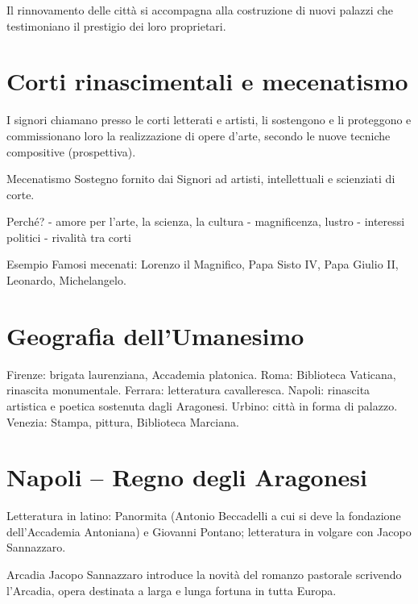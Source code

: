 \documentclass[12pt]{article}
\begin{document}
Il rinnovamento delle città si accompagna alla costruzione di nuovi palazzi che testimoniano il prestigio dei loro proprietari.


\section{Corti rinascimentali e mecenatismo}


I signori chiamano presso le corti letterati e artisti, li sostengono e li proteggono e commissionano loro la realizzazione di opere d'arte, secondo le nuove tecniche compositive (prospettiva).


\begin{defn}{Mecenatismo}
Sostegno fornito dai Signori ad artisti, intellettuali e scienziati di corte.
\end{defn}


Perché? - amore per l'arte, la scienza, la cultura - magnificenza, lustro - interessi politici - rivalità tra corti


\begin{ex}{Esempio}
Famosi mecenati: Lorenzo il Magnifico, Papa Sisto IV, Papa Giulio II, Leonardo, Michelangelo.
\end{ex}


\section{Geografia dell'Umanesimo}


Firenze: brigata laurenziana, Accademia platonica. Roma: Biblioteca Vaticana, rinascita monumentale. Ferrara: letteratura cavalleresca. Napoli: rinascita artistica e poetica sostenuta dagli Aragonesi. Urbino: città in forma di palazzo. Venezia: Stampa, pittura, Biblioteca Marciana.


\section{Napoli – Regno degli Aragonesi}


Letteratura in latino: Panormita (Antonio Beccadelli a cui si deve la fondazione dell'Accademia Antoniana) e Giovanni Pontano; letteratura in volgare con Jacopo Sannazzaro.


\begin{defn}{Arcadia}
Jacopo Sannazzaro introduce la novità del romanzo pastorale scrivendo l'Arcadia, opera destinata a larga e lunga fortuna in tutta Europa.
\end{defn}
\end{document}
